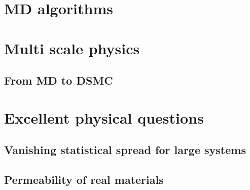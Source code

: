 \section{MD algorithms}

\section{Multi scale physics}
\subsection{From MD to DSMC}
\section{Excellent physical questions}
\subsection{Vanishing statistical spread for large systems}
\subsection{Permeability of real materials}